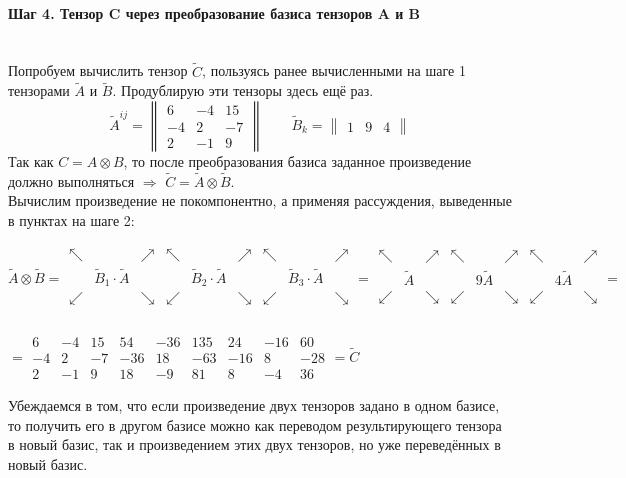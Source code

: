 \documentclass{article}
\begin{document}
\paragraph*{Шаг 4. Тензор C через преобразование базиса тензоров A и B} \, \\
Попробуем вычислить тензор $\tilde{C}$, пользуясь ранее вычисленными на шаге 1 тензорами $\tilde{A}$ и $\tilde{B}$. Продублирую эти тензоры здесь ещё раз.
$$\tilde{A}^{ij} = \begin{Vmatrix}
6 & -4 & 15 \\ -4 & 2 & -7 \\ 2 & -1 & 9
\end{Vmatrix} \qquad \tilde{B}_k = \begin{Vmatrix}
1 & 9 & 4
\end{Vmatrix}$$
Так как $C = A \otimes B$, то после преобразования базиса заданное произведение должно выполняться $\Rightarrow$ $\tilde{C} = \tilde{A} \otimes \tilde{B}$. \\
Вычислим произведение не покомпонентно, а применяя рассуждения, выведенные в пунктах на шаге 2:
\begin{center}
$\tilde{A} \otimes \tilde{B} = \begin{array}{||ccc|ccc|ccc||}
\nwarrow & & \nearrow & \nwarrow & & \nearrow & \nwarrow & & \nearrow \\
& \tilde{B}_1 \cdot \tilde{A} & & & \tilde{B}_2 \cdot \tilde{A} & & & \tilde{B}_3 \cdot \tilde{A} & \\
\swarrow & & \searrow & \swarrow & & \searrow & \swarrow & & \searrow \\
\end{array} = \begin{array}{||ccc|ccc|ccc||}
\nwarrow & & \nearrow & \nwarrow & & \nearrow & \nwarrow & & \nearrow \\
& \tilde{A} & & & 9\tilde{A} & & & 4\tilde{A} & \\
\swarrow & & \searrow & \swarrow & & \searrow & \swarrow & & \searrow \\
\end{array} = $ \\ \, \\
$ = \begin{array}{||ccc|ccc|ccc||}
6 & -4 & 15 & 54 & -36 & 135 & 24 & -16 & 60 \\
-4 & 2 & -7 & -36 & 18 & -63 & -16 & 8 & -28 \\
2 & -1 & 9 & 18 & -9 & 81 & 8 & -4 & 36
\end{array} = \tilde{C}$
\end{center}
Убеждаемся в том, что если произведение двух тензоров задано в одном базисе, то получить его в другом базисе можно как переводом результирующего тензора в новый базис, так и произведением этих двух тензоров, но уже переведённых в новый базис.
\end{document}
